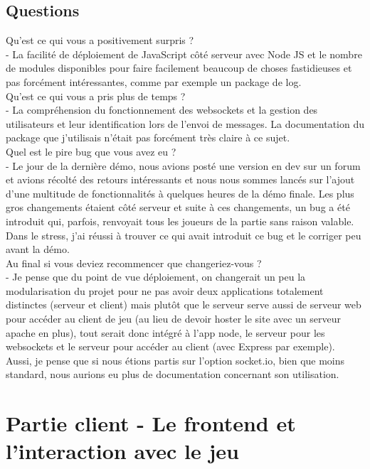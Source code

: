 \documentclass{article}
\begin{document}
\subsection{Questions}
Qu’est ce qui vous a positivement surpris ?\\
 - La facilité de déploiement de JavaScript côté serveur avec Node JS et le nombre de modules disponibles pour faire facilement beaucoup de choses fastidieuses et pas forcément intéressantes, comme par exemple un package de log.\\
Qu’est ce qui vous a pris plus de temps ?\\
 - La compréhension du fonctionnement des websockets et la gestion des utilisateurs et leur identification lors de l'envoi de messages. La documentation du package que j'utilisais n'était pas forcément très claire à ce sujet.\\
Quel est le pire bug que vous avez eu ?\\
 - Le jour de la dernière démo, nous avions posté une version en dev sur un forum et avions récolté des retours intéressants et nous nous sommes lancés sur l'ajout d'une multitude de fonctionnalités à quelques heures de la démo finale. Les plus gros changements étaient côté serveur et suite à ces changements, un bug a été introduit qui, parfois, renvoyait tous les joueurs de la partie sans raison valable. Dans le stress, j'ai réussi à trouver ce qui avait introduit ce bug et le corriger peu avant la démo.\\
Au final si vous deviez recommencer que changeriez-vous ?\\
 - Je pense que du point de vue déploiement, on changerait un peu la modularisation du projet pour ne pas avoir deux applications totalement distinctes (serveur et client) mais plutôt que le serveur serve aussi de serveur web pour accéder au client de jeu (au lieu de devoir hoster le site avec un serveur apache en plus), tout serait donc intégré à l'app node, le serveur pour les websockets et le serveur pour accéder au client (avec Express par exemple). Aussi, je pense que si nous étions partis sur l'option socket.io, bien que moins standard, nous aurions eu plus de documentation concernant son utilisation.
\section{Partie client - Le frontend et l'interaction avec le jeu}
\end{document}
